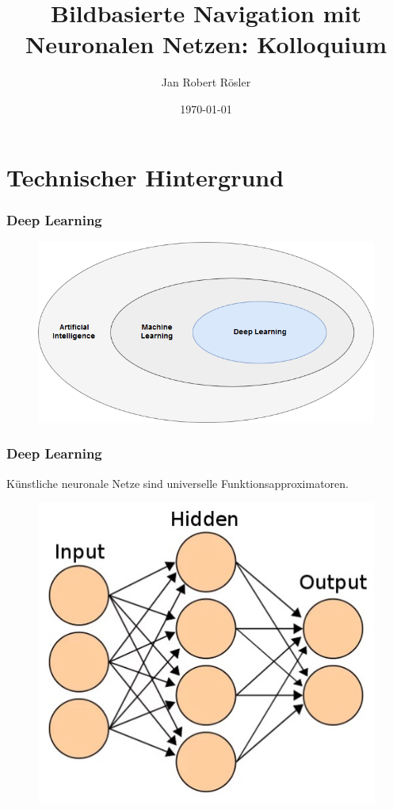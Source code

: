 \documentclass{beamer}
\title{Bildbasierte Navigation mit Neuronalen Netzen: Kolloquium}
\author{Jan Robert Rösler}
\date{\today}
\begin{document}
\maketitle

\frame{\tableofcontents}

\section{Technischer Hintergrund}

\frame{\tableofcontents[currentsection]}

\begin{frame} 
  \frametitle{Deep Learning} 

\begin{figure}
	\centering
	\includegraphics[width=.85\linewidth]{figures/Mengen.png}	 
	\label{img:menge}
\end{figure}

\end{frame}


\begin{frame} 
\frametitle{Deep Learning} 
\centering
Künstliche neuronale Netze sind universelle Funktionsapproximatoren.\\

\begin{figure}
	\centering
	\includegraphics[width=0.4\linewidth]{figures/NN.jpg}
	\label{img:nn}
\end{figure}

\end{frame}
\end{document}
